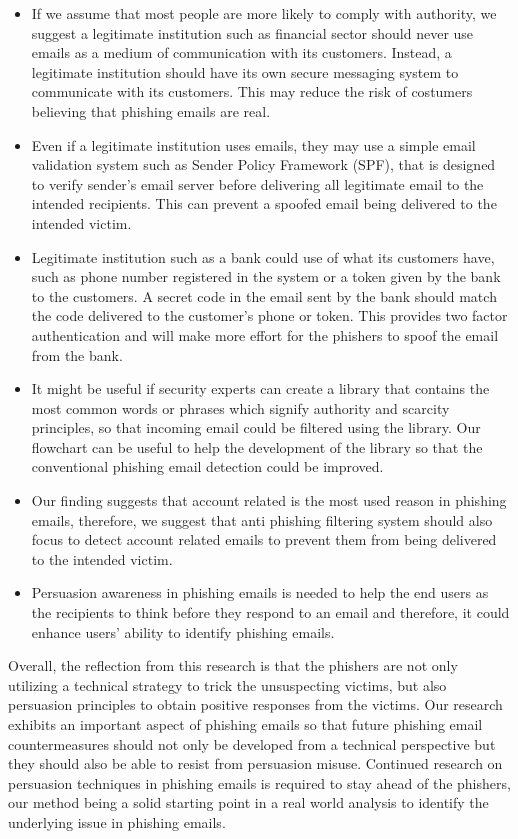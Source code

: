 \begin{itemize}
\item If we assume that most people are more likely to comply with authority,
we suggest a legitimate institution such as financial sector should
never use emails as a medium of communication with its customers.
Instead, a legitimate institution should have its own secure messaging
system to communicate with its customers. This may reduce the risk
of costumers believing that phishing emails are real.
\item Even if a legitimate institution uses emails, they may use a simple
email validation system such as Sender Policy Framework (SPF), that
is designed to verify sender's email server before delivering all
legitimate email to the intended recipients. This can prevent a spoofed
email being delivered to the intended victim. 
\item Legitimate institution such as a bank could use of what its customers
have, such as phone number registered in the system or a token given
by the bank to the customers. A secret code in the email sent by the
bank should match the code delivered to the customer's phone or token.
This provides two factor authentication and will make more effort
for the phishers to spoof the email from the bank. 
\item It might be useful if security experts can create a library that contains
the most common words or phrases which signify authority and scarcity
principles, so that incoming email could be filtered using the library.
Our flowchart can be useful to help the development of the library
so that the conventional phishing email detection could be improved.
\item Our finding suggests that account related is the most used reason
in phishing emails, therefore, we suggest that anti phishing filtering
system should also focus to detect account related emails to prevent
them from being delivered to the intended victim.
\item Persuasion awareness in phishing emails is needed to help the end
users as the recipients to think before they respond to an email and
therefore, it could enhance users' ability to identify phishing emails.
\end{itemize}
Overall, the reflection from this research is that the phishers are
not only utilizing a technical strategy to trick the unsuspecting
victims, but also persuasion principles to obtain positive responses
from the victims. Our research exhibits an important aspect of phishing
emails so that future phishing email countermeasures should not only
be developed from a technical perspective but they should also be
able to resist from persuasion misuse. Continued research on persuasion
techniques in phishing emails is required to stay ahead of the phishers,
our method being a solid starting point in a real world analysis to
identify the underlying issue in phishing emails.


